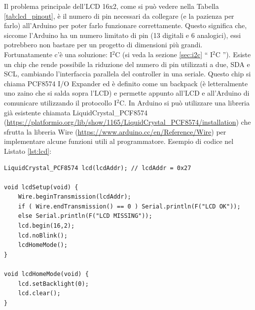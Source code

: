 \documentclass[12pt]{report}
\begin{document}
Il problema principale dell'LCD 16x2, come si può vedere nella Tabella \ref{tab:lcd_pinout}, è il numero di pin necessari da collegare (e la pazienza per farlo) all'Arduino per poter farlo funzionare correttamente. Questo significa che, siccome l'Arduino ha un numero limitato di pin (13 digitali e 6 analogici), essi potrebbero non bastare per un progetto di dimensioni più grandi. Fortunatamente c'è una soluzione: I$^2$C (si veda la sezione \ref{sec:i2c} \textquotedblleft{} I$^2$C \textquotedblright{}). Esiste un chip che rende possibile la riduzione del numero di pin utilizzati a due, SDA e SCL, cambiando l'interfaccia parallela del controller in una seriale. Questo chip si chiama PCF8574 I/O Expander ed è definito come un backpack (è letteralmente uno zaino che si salda sopra l'LCD) e permette appunto all'LCD e all'Arduino di comunicare utilizzando il protocollo I$^2$C. In Arduino si può utilizzare una libreria già esistente chiamata LiquidCrystal\_PCF8574 (\url{https://platformio.org/lib/show/1165/LiquidCrystal_PCF8574/installation}) che sfrutta la libreria Wire (\url{https://www.arduino.cc/en/Reference/Wire}) per implementare alcune funzioni utili al programmatore. Esempio di codice nel Listato \ref{lst:lcd}:
\begin{lstlisting}[caption={L'Arduino inizializza la comunicazione con l'LCD tramite il protocollo I$^2$C e chiama la funzione lcdHomeMode() che semplicemente spegne la retroilluminazione e pulisce il testo.}, label={lst:lcd}]
LiquidCrystal_PCF8574 lcd(lcdAddr); // lcdAddr = 0x27

void lcdSetup(void) {
	Wire.beginTransmission(lcdAddr);
	if ( Wire.endTransmission() == 0 ) Serial.println(F("LCD OK"));
	else Serial.println(F("LCD MISSING"));
	lcd.begin(16,2);
	lcd.noBlink();
	lcdHomeMode();
}

void lcdHomeMode(void) {
	lcd.setBacklight(0);
	lcd.clear();
}

\end{lstlisting}
\end{document}
